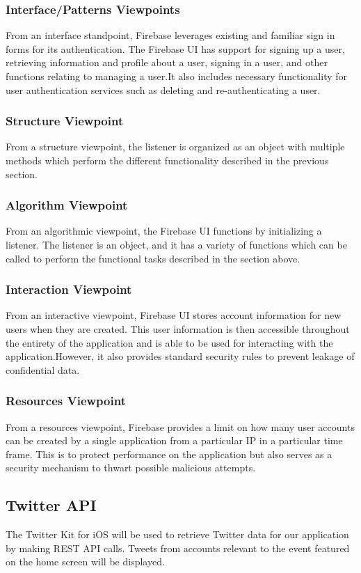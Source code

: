 \documentclass[onecolumn, draftclsnofoot,10pt, compsoc]{IEEEtran}
\begin{document}
\subsubsection{Interface/Patterns Viewpoints}
From an interface standpoint, Firebase leverages existing and familiar sign in forms for its authentication. The Firebase UI has support for signing up a user, retrieving information and profile about a user, signing in a user, and other functions relating to managing a user.It also includes necessary functionality for user authentication services such as deleting and re-authenticating a user.
\subsubsection{Structure Viewpoint}
From a structure viewpoint, the listener is organized as an object with multiple methods which perform the different functionality described in the previous section. 
\subsubsection{Algorithm Viewpoint}
From an algorithmic viewpoint, the Firebase UI functions by initializing a listener. The listener is an object, and it has a variety of functions which can be called to perform the functional tasks described in the section above. 
\subsubsection{Interaction Viewpoint}
From an interactive viewpoint, Firebase UI stores account information for new users when they are created. This user information is then accessible throughout the entirety of the application and is able to be used for interacting with the application.However, it also provides standard security rules to prevent leakage of confidential data.  
\subsubsection{Resources Viewpoint}
From a resources viewpoint, Firebase provides a limit on how many user accounts can be created by a single application from a particular IP in a particular time frame. This is to protect performance on the application but also serves as a security mechanism to thwart possible malicious attempts.
\subsection{Twitter API}
The Twitter Kit for iOS will be used to retrieve Twitter data for our application by making REST API calls\cite{twitter}. 
Tweets from accounts relevant to the event featured on the home screen will be displayed. 
\end{document}
